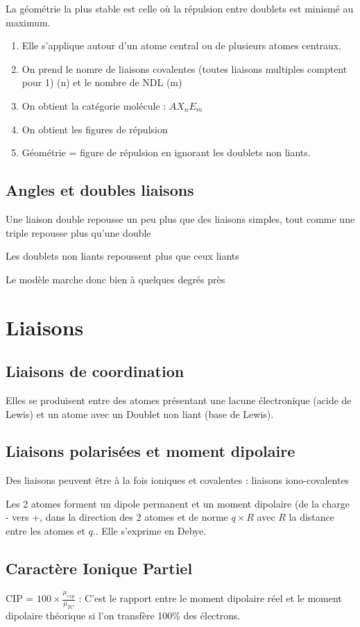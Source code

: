 \documentclass[french]{yLectureNote}
\begin{document}
La géométrie la plus stable est celle où la répulsion entre doublets est minismé au maximum.
\begin{enumerate}
 \item Elle s'applique autour d'un atome central ou de plusieurs atomes centraux.
\item On prend le nomre de liaisons covalentes (toutes liaisons multiples comptent pour 1) (n) et le nombre de NDL (m)
\item On obtient la catégorie molécule : $AX_nE_m$
\item On obtient les figures de répulsion
\item Géométrie = figure de répulsion en ignorant les doublets non liants.
\end{enumerate}
\subsection{Angles et doubles liaisons}
Une liaison double repousse un peu plus que des liaisons simples, tout comme une triple repousse plus qu'une double

Les doublets non liants repoussent plus que ceux liants

Le modèle marche donc bien à quelques degrés près


\section{Liaisons}
\subsection{Liaisons de coordination}
Elles se produisent entre des atomes présentant une lacune électronique (acide de Lewis) et un atome avec un Doublet non liant (base de Lewis).
\subsection{Liaisons polarisées et moment dipolaire}
Des liaisons peuvent \^etre à la fois ioniques et covalentes : liaisons iono-covalentes

Les 2 atomes forment un dipole permanent et un moment dipolaire (de la charge - vers +, dans la direction des 2 atomes et de norme $q\times R$ avec $R$ la distance entre les atomes et $q$.. Elle s'exprime en Debye.

\subsection{Caractère Ionique Partiel}
CIP = $100\times \frac{\mu_{exp}}{\mu_{TC}}$ : C'est le rapport entre le moment dipolaire réel et le moment dipolaire théorique si l'on transfère 100\% des électrons.
\end{document}
